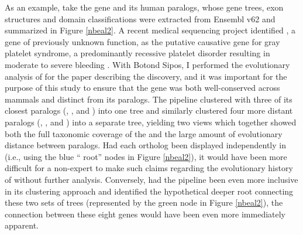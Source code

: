 As an example, take the gene  and its human paralogs,
whose gene trees, exon structures and domain classifications were
extracted from Ensembl v62 and summarized in Figure \ref{nbeal2}. A
recent medical sequencing project identified , a gene of
previously unknown function, as the putative causative gene for gray
platelet syndrome, a predominantly recessive platelet disorder
resulting in moderate to severe bleeding \citep{Albers2011}. With
Botond Sipos, I performed the evolutionary analysis of 
for the paper describing the discovery, and it was important for the
purpose of this study to ensure that the  gene was both
well-conserved across mammals and distinct from its paralogs. The \cmp
pipeline clustered  with three of its closest paralogs
(, , and ) into one tree and
similarly clustered four more distant  paralogs
(, ,  and ) into a
separate tree, yielding two views which together showed both the full
taxonomic coverage of the  \subtr{} and the large amount
of evolutionary distance between paralogs. Had each \mammln ortholog
been displayed independently in \ens (i.e., using the blue ``\euth
root'' nodes in Figure \ref{nbeal2}), it would have been more
difficult for a non-expert to make such claims regarding the
evolutionary history of  without further
analysis. Conversely, had the \cmp pipeline been even more inclusive
in its clustering approach and identified the hypothetical deeper root
connecting these two sets of trees (represented by the green node in
Figure \ref{nbeal2}), the connection between these eight genes would
have been even more immediately apparent.

